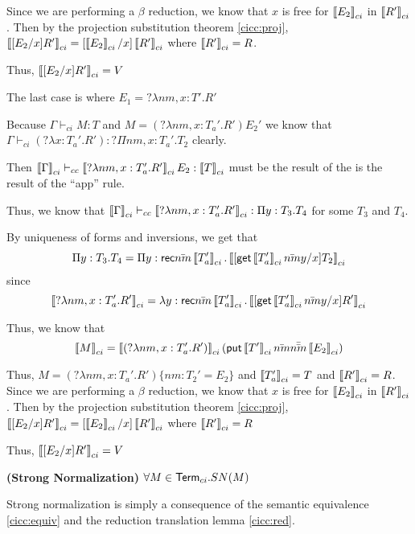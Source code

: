 Since we are performing a $\beta$ reduction, we know that $x$ is free for $\left\llbracket E_2 \right\rrbracket_{ci}$ in 
$\left\llbracket R' \right\rrbracket_{ci}$.  Then by the projection substitution theorem \ref{cicc:proj}, 
$\left\llbracket [E_2/x]R' \right\rrbracket_{ci} = [ \left\llbracket E_2 \right\rrbracket_{ci} / x ] \left\llbracket R' \right\rrbracket_{ci} $ where $\left\llbracket R' \right\rrbracket_{ci} = R$.

Thus, $\left\llbracket [E_2 / x] R' \right\rrbracket_{ci} = V$

\begin{tcases}
The last case is where $E_1 = ?\lambda nm,x : T' . R'$
\end{tcases}

Because $\Gamma \vdash_{ci} M : T$ and $M = (?\lambda nm,x : T_a' . R') E_2'$
we know that $\Gamma \vdash_{ci} (?\lambda x : T_a' . R') : ?\Pi nm,x : T_a' . T_2$ clearly.  

Then $\left\llbracket \Gamma \right\rrbracket_{ci} \vdash_{cc} \left\llbracket ?\lambda nm,x : T_a' . R' \right\rrbracket_{ci} E_2 : \left\llbracket T \right\rrbracket_{ci}$
 must be the result of the is the result of the ``app'' rule. 

Thus, we know that $\left\llbracket \Gamma \right\rrbracket_{ci} \vdash_{cc} \left\llbracket ?\lambda nm,x : T_a' . R' \right\rrbracket_{ci} : \Pi y : T_3 . T_4$ for some $T_3$ and $T_4$.

By uniqueness of forms and inversions, we get that 
\[
\Pi y : T_3 . T_4 
= \Pi y : \mathsf{rec} \bar{nm}\left\llbracket T_a' \right\rrbracket_{ci} . \left\llbracket [ \mathsf{get} \left\llbracket T_a' \right\rrbracket_{ci} \bar{nm} y / x ] T_2 \right\rrbracket_{ci}
\]
since 
\[
\left\llbracket ?\lambda nm,x : T_a' . R' \right\rrbracket_{ci} 
= 
\lambda y : \mathsf{rec} \bar{nm}\left\llbracket T_a' \right\rrbracket_{ci} . \left\llbracket [ \mathsf{get} \left\llbracket T_a' \right\rrbracket_{ci} \bar{nm} y / x ] R' \right\rrbracket_{ci}
\]

Thus, we know that 
\[
\left\llbracket M \right\rrbracket_{ci} = 
\left\llbracket (?\lambda nm,x : T_a' . R') \right\rrbracket_{ci} (\mathsf{put} \left\llbracket T' \right\rrbracket_{ci}\bar{nm}\bar{\bar{nm}} \left\llbracket E_2 \right\rrbracket_{ci})
\]

Thus, $M = (?\lambda nm,x : T_a' . R')\{ nm : T_2' = E_2\} $ and $\left\llbracket T_a' \right\rrbracket_{ci} = T$ 
and $\left\llbracket R' \right\rrbracket_{ci} = R$.  Since we are performing a $\beta$ reduction, we know that
$x$ is free for $\left\llbracket E_2 \right\rrbracket_{ci}$ in $\left\llbracket R' \right\rrbracket_{ci}$.  
Then by the projection substitution theorem \ref{cicc:proj}, 
$\left\llbracket [E_2/x]R' \right\rrbracket_{ci} = [ \left\llbracket E_2 \right\rrbracket_{ci}/x ] \left\llbracket R' \right\rrbracket_{ci}$
where $\left\llbracket R' \right\rrbracket_{ci} = R$

Thus, $\left\llbracket [E_2/x] R' \right\rrbracket_{ci} = V$



\begin{theorem}
\textbf{(Strong Normalization)} $\forall M \in \mathsf{Term}_{ci}. SN(M)$
\label{ci:sn}
\end{theorem}

Strong normalization is simply a consequence of the semantic equivalence \ref{cicc:equiv} and the 
reduction translation lemma \ref{cicc:red}.

